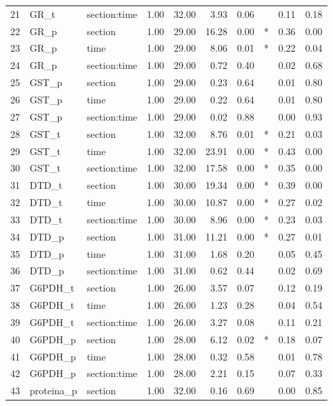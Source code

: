 \begin{table}[ht]
\begin{tabular}{rllrrrrlrr}
  21 & GR\_t & section:time & 1.00 & 32.00 & 3.93 & 0.06 &  & 0.11 & 0.18 \\ 
  22 & GR\_p & section & 1.00 & 29.00 & 16.28 & 0.00 & * & 0.36 & 0.00 \\ 
  23 & GR\_p & time & 1.00 & 29.00 & 8.06 & 0.01 & * & 0.22 & 0.04 \\ 
  24 & GR\_p & section:time & 1.00 & 29.00 & 0.72 & 0.40 &  & 0.02 & 0.68 \\ 
  25 & GST\_p & section & 1.00 & 29.00 & 0.23 & 0.64 &  & 0.01 & 0.80 \\ 
  26 & GST\_p & time & 1.00 & 29.00 & 0.22 & 0.64 &  & 0.01 & 0.80 \\ 
  27 & GST\_p & section:time & 1.00 & 29.00 & 0.02 & 0.88 &  & 0.00 & 0.93 \\ 
  28 & GST\_t & section & 1.00 & 32.00 & 8.76 & 0.01 & * & 0.21 & 0.03 \\ 
  29 & GST\_t & time & 1.00 & 32.00 & 23.91 & 0.00 & * & 0.43 & 0.00 \\ 
  30 & GST\_t & section:time & 1.00 & 32.00 & 17.58 & 0.00 & * & 0.35 & 0.00 \\ 
  31 & DTD\_t & section & 1.00 & 30.00 & 19.34 & 0.00 & * & 0.39 & 0.00 \\ 
  32 & DTD\_t & time & 1.00 & 30.00 & 10.87 & 0.00 & * & 0.27 & 0.02 \\ 
  33 & DTD\_t & section:time & 1.00 & 30.00 & 8.96 & 0.00 & * & 0.23 & 0.03 \\ 
  34 & DTD\_p & section & 1.00 & 31.00 & 11.21 & 0.00 & * & 0.27 & 0.01 \\ 
  35 & DTD\_p & time & 1.00 & 31.00 & 1.68 & 0.20 &  & 0.05 & 0.45 \\ 
  36 & DTD\_p & section:time & 1.00 & 31.00 & 0.62 & 0.44 &  & 0.02 & 0.69 \\ 
  37 & G6PDH\_t & section & 1.00 & 26.00 & 3.57 & 0.07 &  & 0.12 & 0.19 \\ 
  38 & G6PDH\_t & time & 1.00 & 26.00 & 1.23 & 0.28 &  & 0.04 & 0.54 \\ 
  39 & G6PDH\_t & section:time & 1.00 & 26.00 & 3.27 & 0.08 &  & 0.11 & 0.21 \\ 
  40 & G6PDH\_p & section & 1.00 & 28.00 & 6.12 & 0.02 & * & 0.18 & 0.07 \\ 
  41 & G6PDH\_p & time & 1.00 & 28.00 & 0.32 & 0.58 &  & 0.01 & 0.78 \\ 
  42 & G6PDH\_p & section:time & 1.00 & 28.00 & 2.21 & 0.15 &  & 0.07 & 0.33 \\ 
  43 & proteina\_p & section & 1.00 & 32.00 & 0.16 & 0.69 &  & 0.00 & 0.85 \\ 

\end{tabular}
\end{table}
